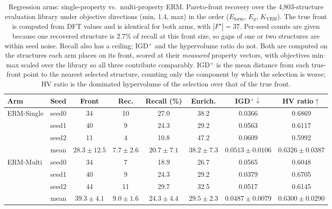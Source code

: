 \begin{table}[htbp]
\renewcommand{\arraystretch}{1.2}
\setlength{\tabcolsep}{4pt}
\caption{Regression arms: single-property vs.\ multi-property ERM. Pareto-front recovery over the 4{,}803-structure evaluation library under objective directions (min, 1.4, max) in the order ($E_\mathrm{form}$, $E_g$, $K_\mathrm{VRH}$). The true front is computed from DFT values and is identical for both arms, with $|F^\star|{=}37$. Per-seed counts are given because one recovered structure is 2.7\% of recall at this front size, so gaps of one or two structures are within seed noise. Recall also has a ceiling; IGD$^+$ and the hypervolume ratio do not. Both are computed on the structures each arm places on its front, scored at their \emph{measured} property vectors, with objectives min--max scaled over the library so all three contribute comparably. IGD$^+$ is the mean distance from each true-front point to the nearest selected structure, counting only the component by which the selection is worse; HV ratio is the dominated hypervolume of the selection over that of the true front.}
\label{tab:pareto_arms_erm_heldout_min_1_4_max}
\centering
\footnotesize
\begin{tabular}{@{}llcccccc@{}}
\hline\hline
\textbf{Arm} & \textbf{Seed} & \textbf{Front} & \textbf{Rec.} & \textbf{Recall (\%)} & \textbf{Enrich.} & \textbf{IGD$^+\downarrow$} & \textbf{HV ratio$\uparrow$} \\
\hline
\multirow{4}{*}{ERM-Single}
  & seed0 & 34 & 10 & 27.0 & 38.2 & 0.0366 & 0.6869 \\
  & seed1 & 40 & 9 & 24.3 & 29.2 & 0.0563 & 0.6117 \\
  & seed2 & 11 & 4 & 10.8 & 47.2 & 0.0609 & 0.5992 \\
  & mean & $28.3 \pm 12.5$ & $7.7 \pm 2.6$ & $20.7 \pm 7.1$ & $38.2 \pm 7.3$ & $0.0513 \pm 0.0106$ & $0.6326 \pm 0.0387$ \\
\hline
\multirow{4}{*}{ERM-Multi}
  & seed0 & 34 & 7 & 18.9 & 26.7 & 0.0565 & 0.6048 \\
  & seed1 & 40 & 9 & 24.3 & 29.2 & 0.0379 & 0.6705 \\
  & seed2 & 44 & 11 & 29.7 & 32.5 & 0.0517 & 0.6145 \\
  & mean & $39.3 \pm 4.1$ & $9.0 \pm 1.6$ & $24.3 \pm 4.4$ & $29.5 \pm 2.3$ & $0.0487 \pm 0.0079$ & $0.6300 \pm 0.0290$ \\
\hline\hline
\end{tabular}
\end{table}
